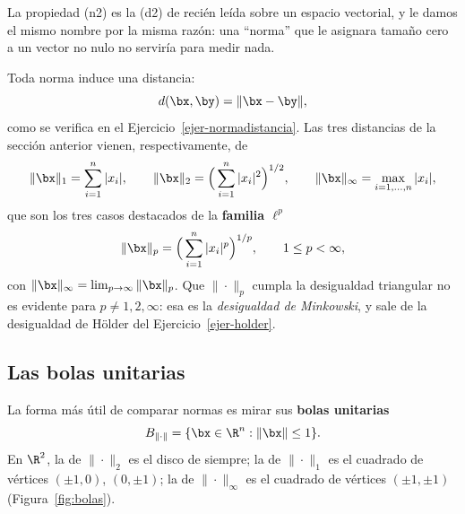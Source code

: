 La propiedad (n2) es la (d2) de recién leída sobre un espacio vectorial, y le
damos el mismo nombre por la misma razón: una ``norma'' que le asignara
tamaño cero a un vector no nulo no serviría para medir nada.

Toda norma induce una distancia:
\begin{equation}\label{eq:dist-de-norma}
d(\bx,\by)=\|\bx-\by\| ,
\end{equation}
como se verifica en el Ejercicio~\ref{ejer-normadistancia}. Las tres
distancias de la sección anterior vienen, respectivamente, de
\begin{equation}\label{eq:normas-p}
\|\bx\|_1=\sum_{i=1}^n|x_i|,
\qquad
\|\bx\|_2=\Big(\sum_{i=1}^n|x_i|^2\Big)^{1/2},
\qquad
\|\bx\|_\infty=\max_{i=1,\dots,n}|x_i| ,
\end{equation}
que son los tres casos destacados de la \textbf{familia $\ell^p$}
\[
\|\bx\|_p=\Big(\sum_{i=1}^n|x_i|^p\Big)^{1/p},\qquad 1\le p<\infty,
\]
con $\|\bx\|_\infty=\lim_{p\to\infty}\|\bx\|_p$. Que $\|\cdot\|_p$ cumpla la
desigualdad triangular no es evidente para $p\neq1,2,\infty$: esa es la
\emph{desigualdad de Minkowski}, y sale de la desigualdad de Hölder del
Ejercicio~\ref{ejer-holder}.

\subsection{Las bolas unitarias}
\label{sec:bolas}

La forma más útil de comparar normas es mirar sus \textbf{bolas unitarias}
\[
B_{\|\cdot\|}=\{\bx\in\R^n : \|\bx\|\le 1\} .
\]
En $\R^2$, la de $\|\cdot\|_2$ es el disco de siempre; la de $\|\cdot\|_1$ es
el cuadrado de vértices $(\pm1,0)$, $(0,\pm1)$; la de $\|\cdot\|_\infty$ es
el cuadrado de vértices $(\pm1,\pm1)$ (Figura~\ref{fig:bolas}).

